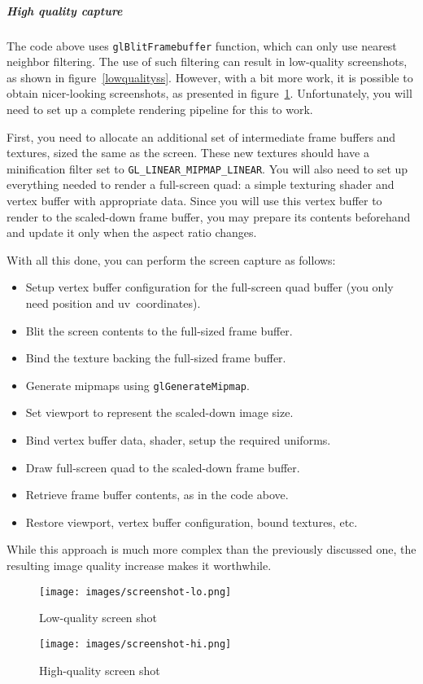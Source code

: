 \documentclass[hidelinks,titlepage,a4paper,twoside]{article}
\begin{document}
\subparagraph{High quality capture}

The code above uses \texttt{glBlitFramebuffer} function, which can only use nearest neighbor filtering. The use of such filtering can result in low-quality screenshots, as shown in figure~\ref{lowqualityss}. However, with a bit more work, it is possible to obtain nicer-looking screenshots, as presented in figure~\ref{highqualityss}. Unfortunately, you will need to set up a complete rendering pipeline for this to work.

First, you need to allocate an additional set of intermediate frame buffers and textures, sized the same as the screen. These new textures should have a minification filter set to \texttt{GL\_LINEAR\_MIPMAP\_LINEAR}. You will also need to set up everything needed to render a full-screen quad: a simple texturing shader and vertex buffer with appropriate data. Since you will use this vertex buffer to render to the scaled-down frame buffer, you may prepare its contents beforehand and update it only when the aspect ratio changes.

With all this done, you can perform the screen capture as follows:

\begin{itemize}
\item Setup vertex buffer configuration for the full-screen quad buffer (you only need position and uv~coordinates).
\item Blit the screen contents to the full-sized frame buffer.
\item Bind the texture backing the full-sized frame buffer.
\item Generate mipmaps using \texttt{glGenerateMipmap}.
\item Set viewport to represent the scaled-down image size.
\item Bind vertex buffer data, shader, setup the required uniforms.
\item Draw full-screen quad to the scaled-down frame buffer.
\item Retrieve frame buffer contents, as in the code above.
\item Restore viewport, vertex buffer configuration, bound textures, etc.
\end{itemize}

While this approach is much more complex than the previously discussed one, the resulting image quality increase makes it worthwhile.

\begin{figure}[h]
\centering
\begin{minipage}{0.45\textwidth}
\centering
\texttt{[image: images/screenshot-lo.png]}
\caption{Low-quality screen shot}
\label{lowqualityss}
\end{minipage}\hfill
\begin{minipage}{0.45\textwidth}
\centering
\texttt{[image: images/screenshot-hi.png]}
\caption{High-quality screen shot}
\label{highqualityss}
\end{minipage}
\end{figure}
\end{document}
